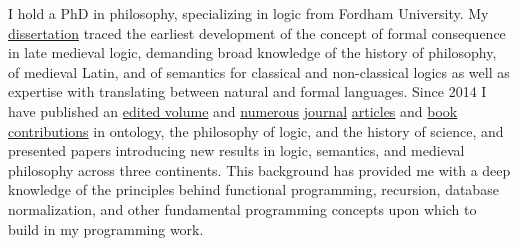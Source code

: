I hold a PhD in philosophy, specializing in logic from Fordham University. 
My \href{https://www.academia.edu/32939933/The_development_of_the_medieval_Parisian_account_of_formal_consequence}{dissertation} traced the earliest development of the concept of formal consequence
in late medieval logic, demanding 
broad knowledge 
of the history of philosophy, 
of medieval Latin, 
and 
of semantics for classical and non-classical logics 
as well as  
expertise with translating between natural and formal languages. 
Since 2014 I have published an \href{https://brill.com/view/journals/viv/56/3-4/viv.56.issue-3-4.xml?language=en}{edited volume} and  
\href{https://link.springer.com/article/10.1007/s11787-019-00229-x}{numerous} \href{https://link.springer.com/article/10.1007/s11787-017-0162-7}{journal} \href{https://www.jstor.org/stable/43658430}{articles} and  \href{https://www.cambridgescholars.com/download/sample/64716}{book} \href{http://www.collegepublications.co.uk/dialogues/?00005}{contributions}
in 
ontology, 
the philosophy of logic, 
and the history of science, 
and presented papers introducing new results in logic, semantics, and medieval philosophy across three continents. This background has provided me with a deep knowledge of the principles behind functional programming, recursion, database normalization, and other fundamental programming concepts upon which to build in my programming work.
